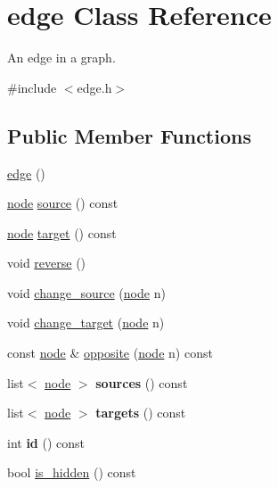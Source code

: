 \hypertarget{classedge}{}\section{edge Class Reference}
\label{classedge}


An edge in a graph.  




{\ttfamily \#include $<$edge.\+h$>$}

\subsection*{Public Member Functions}
\begin{DoxyCompactItemize}
\item 
\mbox{\hyperlink{classedge_a41859d2473a15e24255d7bc0de1f49b4}{edge}} ()
\item 
\mbox{\hyperlink{classnode}{node}} \mbox{\hyperlink{classedge_ae82d5701f7e6f71edc3c8b0e34bcd2b7}{source}} () const
\item 
\mbox{\hyperlink{classnode}{node}} \mbox{\hyperlink{classedge_a97563b611261478ee19c6ce055f1a3ee}{target}} () const
\item 
void \mbox{\hyperlink{classedge_ad62516eb40dbee9f57a2078cfd97b4c9}{reverse}} ()
\item 
void \mbox{\hyperlink{classedge_ad9e615b1a11bbc88aae2b166d377f354}{change\+\_\+source}} (\mbox{\hyperlink{classnode}{node}} n)
\item 
void \mbox{\hyperlink{classedge_a2f797fda0f41412265d793982f2cf953}{change\+\_\+target}} (\mbox{\hyperlink{classnode}{node}} n)
\item 
const \mbox{\hyperlink{classnode}{node}} \& \mbox{\hyperlink{classedge_ab64dc3659c9003337b0c3749a8b879cf}{opposite}} (\mbox{\hyperlink{classnode}{node}} n) const
\item 
\mbox{\label{classedge_a01481a54b506f99dfad3ab64bc16715d}} 
list$<$ \mbox{\hyperlink{classnode}{node}} $>$ {\bfseries sources} () const
\item 
\mbox{\label{classedge_a2f0aa8c08e508f81734e360710237639}} 
list$<$ \mbox{\hyperlink{classnode}{node}} $>$ {\bfseries targets} () const
\item 
\mbox{\label{classedge_aa7635988ab396748d6081ae5d273923b}} 
int {\bfseries id} () const
\item 
bool \mbox{\hyperlink{classedge_ab6d6192a90b1cb77ce9dee2de78d9743}{is\+\_\+hidden}} () const
\end{DoxyCompactItemize}
